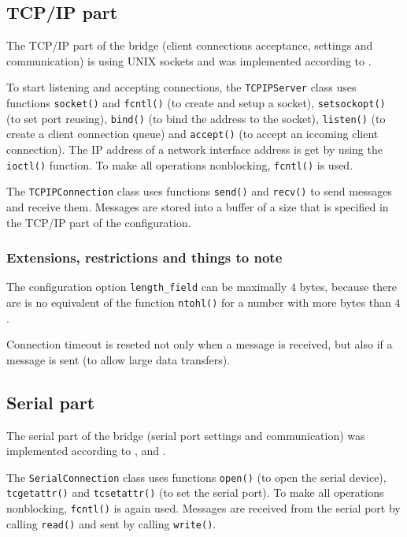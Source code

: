 \subsection{TCP/IP part}

The TCP/IP part of the bridge (client connections acceptance, settings and
communication) is using UNIX sockets and was implemented according to
\cite{UNIXNetworkProgramming}.

To start listening and accepting connections, the \texttt{TCPIPServer} class uses
functions \texttt{socket()} and \texttt{fcntl()} (to create and setup a socket),
\texttt{setsockopt()} (to set port reusing),
\texttt{bind()} (to bind the address to the socket), \texttt{listen()} (to create
a client connection queue) and \texttt{accept()} (to accept an iccoming
client connection). The IP address of a network interface address is get
by using the \texttt{ioctl()} function. To make all operations nonblocking,
\texttt{fcntl()} is used.

The \texttt{TCPIPConnection} class uses functions \texttt{send()} and \texttt{recv()} to
send messages and receive them. Messages are stored into a buffer of a size
that is specified in the TCP/IP part of the configuration.

\subsubsection{Extensions, restrictions and things to note}

The configuration option \texttt{length\_field} can be maximally $4$ bytes,
because there are is no equivalent of the function \texttt{ntohl()}
for a number with more bytes than $4$.

Connection timeout is reseted not only when a message is received,
but also if a message is sent (to allow large data transfers).

\subsection{Serial part}

The serial part of the bridge (serial port settings and communication)
was implemented according to \cite{SerialHOWTO}, \cite{LinuxSerialPortProgramming}
and \cite{POSIXSerialProgramProgramming}.

The \texttt{SerialConnection} class uses functions \texttt{open()} (to open
the serial device), \texttt{tcgetattr()} and \texttt{tcsetattr()} (to set the
serial port). To make all operations nonblocking, \texttt{fcntl()} is again used.
Messages are received from the serial port by calling \texttt{read()}
and sent by calling \texttt{write()}.


